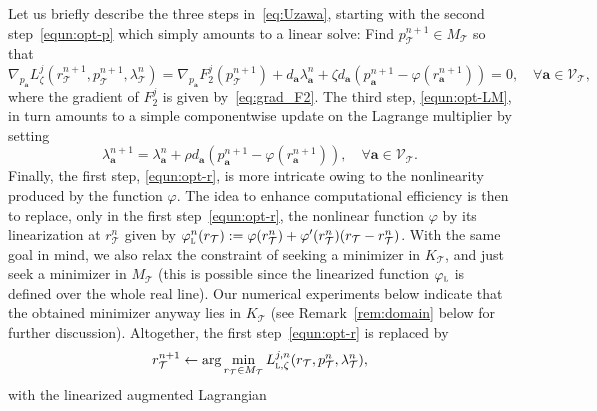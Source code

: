\documentclass[a4paper,11pt]{article}
\theoremstyle{definition}
\theoremstyle{remark}
\numberwithin{equation}{section}
\newcommand{\disr}{r_\calT}
\newcommand{\disp}{p_\calT}
\newcommand{\disK}{K_\calT}
\newcommand{\disM}{M_\calT}
\newcommand{\disLamb}{\lambda_\calT}
\newcommand{\ba}{{\boldsymbol a}}
\newcommand{\calT}{\mathcal{T}}
\newcommand{\calV}{\mathcal{V}}
\newcommand{\vertex}{\calV_\calT}
\begin{document}
Let us briefly describe the three steps in~\eqref{eq:Uzawa}, starting with the second step~\eqref{equn:opt-p} which simply amounts to a linear solve: Find $\disp^{n+1}\in\disM$ so that
\begin{equation} \label{eq:linsys-p}
\nabla_{p_{\ba}}  {L}^j_\zeta(\disr^{n+1}, \disp^{n+1}, \disLamb^{n})=\nabla_{p_{\ba}}  F_2^j(\disp^{n+1})   + d_{\ba} \lambda_{\ba}^{n} +\zeta d_{\ba} (p_{\ba}^{n+1} - \varphi(r_{\ba}^{n+1}))=0, \quad \forall\ba\in \vertex,
\end{equation}       
where the gradient of $F_2^j$ is given by~\eqref{eq:grad_F2}.
The third step, \eqref{equn:opt-LM}, in turn amounts to a simple componentwise 
update on the Lagrange multiplier by setting
\begin{equation} \label{eq:update-LM}
\lambda_\ba^{n+1} = \lambda_\ba^{n} + \rho d_\ba (p_\ba^{n+1}- \varphi(r_\ba^{n+1})), \quad \forall \ba\in \vertex.
\end{equation}
Finally, the first step, \eqref{equn:opt-r}, is more intricate owing to the nonlinearity produced by the function $\varphi$. The idea to enhance computational efficiency is then to replace, only in the first step~\eqref{equn:opt-r}, the nonlinear function $\varphi$ by its linearization at $\disr^{n}$ given by $\varphi_{\textsc{l}}^n(\disr):=\varphi(\disr^{n})+\varphi'(\disr^{n})(\disr-\disr^{n})$. With the same goal in mind, we also relax the constraint of seeking a minimizer in $\disK$, and just seek a minimizer in $\disM$ (this is possible since the linearized function $\varphi_{\textsc{l}}$ is defined over the whole real line). Our numerical experiments below indicate that the obtained minimizer anyway lies in $\disK$ (see Remark~\ref{rem:domain} below for further discussion). Altogether, the first step~\eqref{equn:opt-r} is replaced by 
\begin{equation} \label{eq:step1_linLag}
\disr^{n+1} \leftarrow \text{arg}\min_{\disr\in \disM}{L}^{j,n}_{\textsc{l},\zeta} (\disr,\disp^n, \disLamb^n),
\end{equation}
with the linearized augmented Lagrangian 
\end{document}
